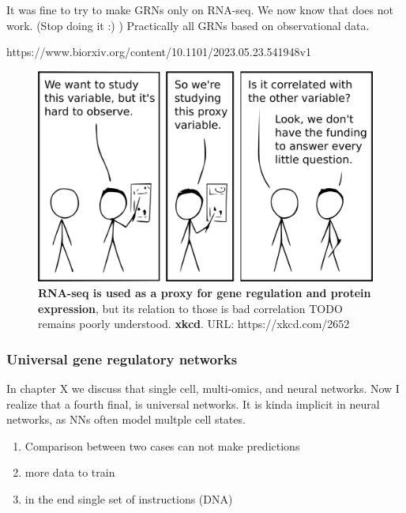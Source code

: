 It was fine to try to make GRNs only on RNA-seq. We now know that does not work. (Stop doing it :) )
Practically all GRNs based on observational data.

https://www.biorxiv.org/content/10.1101/2023.05.23.541948v1



\begin{figure}[H]
    \includegraphics[width=\linewidth]{ch.discussion/imgs/xkcd_proxy.png}
    \caption{\textbf{RNA-seq is used as a proxy for gene regulation and protein expression}, but its relation to those is bad correlation TODO remains poorly understood. \textbf{xkcd}. URL: https://xkcd.com/2652}
    \label{fig:xkcd_proxy}
\end{figure}

\subsubsection{Universal gene regulatory networks}

In chapter X we discuss that single cell, multi-omics, and neural networks. Now I realize that a fourth final, is universal networks. It is kinda implicit in neural networks, as NNs often model multple cell states.

\begin{enumerate}
    \item Comparison between two cases can not make predictions
    \item more data to train
    \item in the end single set of instructions (DNA)
\end{enumerate}


